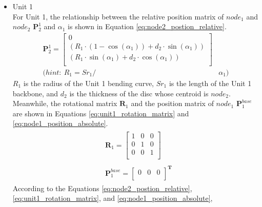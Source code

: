 \begin{itemize}
    \item Unit 1 \\
    For Unit 1, the relationship between the relative position matrix of $node_1$ and $node_2$ $\textbf{P}_{2}^{1}$ and 
    $\alpha_1$ is shown in Equation \ref{eq:node2_postion_relative}.
    \begin{align}
        \textbf{P}_{2}^{1} = 
        \begin{bmatrix}
            0 \\
            (R_1\cdot(1-\cos(\alpha_1)) + d_2\cdot \sin(\alpha_1)) \\
            (R_1\cdot \sin(\alpha_1) + d_2\cdot \cos(\alpha_1)) \\
        \end{bmatrix}&
        \label{eq:node2_postion_relative} \\
        \nonumber (hint: \ R_1 = {Sr}_1/ &\alpha_1)
    \end{align}
    $R_1$ is the radius of the Unit 1 bending curve, ${Sr}_1$ is the length of the Unit 1 backbone, and $d_2$ is the thickness 
    of the disc whose centroid is $node_2$. Meanwhile, the rotational matrix $\textbf{R}_{1}$ and the position matrix of 
    $node_1$ $\textbf{P}_{1}^{base}$ are shown in Equations \ref*{eq:unit1_rotation_matrix} and \ref{eq:node1_position_absolute}.
    \begin{align}
        &\begin{aligned}
            \textbf{R}_{1} = 
            \begin{bmatrix}
                1 & 0 & 0 \\
                0 & 1 & 0 \\
                0 & 0 & 1 \\
            \end{bmatrix}
        \end{aligned}
        \label{eq:unit1_rotation_matrix} \\
        &\begin{aligned}
            \textbf{P}_{1}^{base} = 
            \begin{bmatrix}
                0 & 0 & 0\\
            \end{bmatrix}^{\textbf{T}}
        \end{aligned}
        \label{eq:node1_position_absolute}
    \end{align}
    According to the Equations \ref{eq:node2_postion_relative}, \ref*{eq:unit1_rotation_matrix}, and \ref{eq:node1_position_absolute}, 

\end{itemize}
